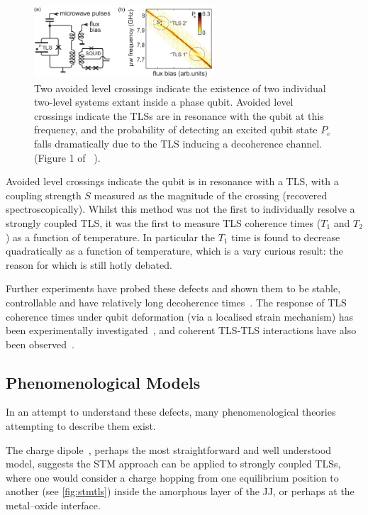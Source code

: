 \begin{figure}[htp]
\includegraphics[width=0.6\textwidth]{figures/alclisenfeld2010}
\caption[Avoided Level Crossings in Qubit Spectroscopy]{\label{fig:alc}Two avoided level crossings indicate the existence of two individual two-level systems extant inside a phase qubit. Avoided level crossings indicate the TLSs are in resonance with the qubit at this frequency, and the probability of detecting an excited qubit state $P_e$ falls dramatically due to the TLS inducing a decoherence channel. (Figure 1 of \citeauthor{Lisenfeld2010}~\cite{Lisenfeld2010}).}
\end{figure}

Avoided level crossings indicate the qubit is in resonance with a TLS, with a coupling strength $S$ measured as the magnitude of the crossing (recovered spectroscopically).
Whilst this method was not the first to individually resolve a strongly coupled TLS, it was the first to measure TLS coherence times ($T_1$ and $T_2$) as a function of temperature.
In particular the $T_1$ time is found to decrease quadratically as a function of temperature, which is a vary curious result: the reason for which is still hotly debated.

Further experiments have probed these defects and shown them to be stable, controllable and have relatively long decoherence times~\cite{Simmonds2004, Neeley2008, Shalibo2010, Lupascu2009, Gunnarsson2013}.
The response of TLS coherence times under qubit deformation (via a localised strain mechanism) has been experimentally investigated~\cite{Grabovskij2012}, and coherent TLS-TLS interactions have also been observed~\cite{Lisenfeld2015}.

\subsection{Phenomenological Models}

In an attempt to understand these defects, many phenomenological theories attempting to describe them exist.

The charge dipole~\cite{Martinis2005}, perhaps the most straightforward and well understood model, suggests the STM approach can be applied to strongly coupled TLSs, where one would consider a charge hopping from one equilibrium position to another (see \cref{fig:stmtls}) inside the amorphous layer of the JJ, or perhaps at the metal--oxide interface.

